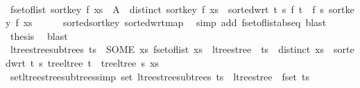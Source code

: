 \begin{isabellebody}
\ \ \isamarkupfalse%
\ \isamarkupfalse%
\ {\isachardoublequoteopen}fset{\isacharunderscore}{\kern0pt}of{\isacharunderscore}{\kern0pt}list\ {\isacharparenleft}{\kern0pt}sort{\isacharunderscore}{\kern0pt}key\ f\ xs{\isacharparenright}{\kern0pt}\ {\isacharequal}{\kern0pt}\ A\ {\isasymand}\ distinct\ {\isacharparenleft}{\kern0pt}sort{\isacharunderscore}{\kern0pt}key\ f\ xs{\isacharparenright}{\kern0pt}\ {\isasymand}\ sorted{\isacharunderscore}{\kern0pt}wrt\ {\isacharparenleft}{\kern0pt}{\isasymlambda}t\ s{\isachardot}{\kern0pt}\ f\ t\ {\isasymle}\ f\ s{\isacharparenright}{\kern0pt}\ {\isacharparenleft}{\kern0pt}sort{\isacharunderscore}{\kern0pt}key\ f\ xs{\isacharparenright}{\kern0pt}{\isachardoublequoteclose}\isanewline
\ \ \ \ \isamarkupfalse%
\ sorted{\isacharunderscore}{\kern0pt}sort{\isacharunderscore}{\kern0pt}key\ sorted{\isacharunderscore}{\kern0pt}wrt{\isacharunderscore}{\kern0pt}map\ \isamarkupfalse%
\ {\isacharparenleft}{\kern0pt}simp\ add{\isacharcolon}{\kern0pt}\ fset{\isacharunderscore}{\kern0pt}of{\isacharunderscore}{\kern0pt}list{\isachardot}{\kern0pt}abs{\isacharunderscore}{\kern0pt}eq{\isacharcomma}{\kern0pt}\ blast{\isacharparenright}{\kern0pt}\isanewline
\ \ \isamarkupfalse%
\ \isamarkupfalse%
\ {\isacharquery}{\kern0pt}thesis\ \isamarkupfalse%
\ blast\isanewline
{}\isamarkupfalse%
%
\endisatagproof
{\isafoldproof}%
%
\isadelimproof
\isanewline
%
\endisadelimproof
\isanewline
{}\isamarkupfalse%
\ {\isachardoublequoteopen}ltree{\isacharunderscore}{\kern0pt}stree{\isacharunderscore}{\kern0pt}subtrees\ ts\ {\isasymequiv}\ SOME\ xs{\isachardot}{\kern0pt}\ fset{\isacharunderscore}{\kern0pt}of{\isacharunderscore}{\kern0pt}list\ xs\ {\isacharequal}{\kern0pt}\ ltree{\isacharunderscore}{\kern0pt}stree\ {\isacharbar}{\kern0pt}{\isacharbackquote}{\kern0pt}{\isacharbar}{\kern0pt}\ ts\ {\isasymand}\ distinct\ xs\ {\isasymand}\ sorted{\isacharunderscore}{\kern0pt}wrt\ {\isacharparenleft}{\kern0pt}{\isasymlambda}t\ s{\isachardot}{\kern0pt}\ tree{\isacharunderscore}{\kern0pt}ltree\ t\ {\isasymle}\ tree{\isacharunderscore}{\kern0pt}ltree\ s{\isacharparenright}{\kern0pt}\ xs{\isachardoublequoteclose}\isanewline
\isanewline
{}\isamarkupfalse%
\ set{\isacharunderscore}{\kern0pt}ltree{\isacharunderscore}{\kern0pt}stree{\isacharunderscore}{\kern0pt}subtrees{\isacharbrackleft}{\kern0pt}simp{\isacharbrackright}{\kern0pt}{\isacharcolon}{\kern0pt}\ {\isachardoublequoteopen}set\ {\isacharparenleft}{\kern0pt}ltree{\isacharunderscore}{\kern0pt}stree{\isacharunderscore}{\kern0pt}subtrees\ ts{\isacharparenright}{\kern0pt}\ {\isacharequal}{\kern0pt}\ ltree{\isacharunderscore}{\kern0pt}stree\ {\isacharbackquote}{\kern0pt}\ fset\ ts{\isachardoublequoteclose}\isanewline

\end{isabellebody}

